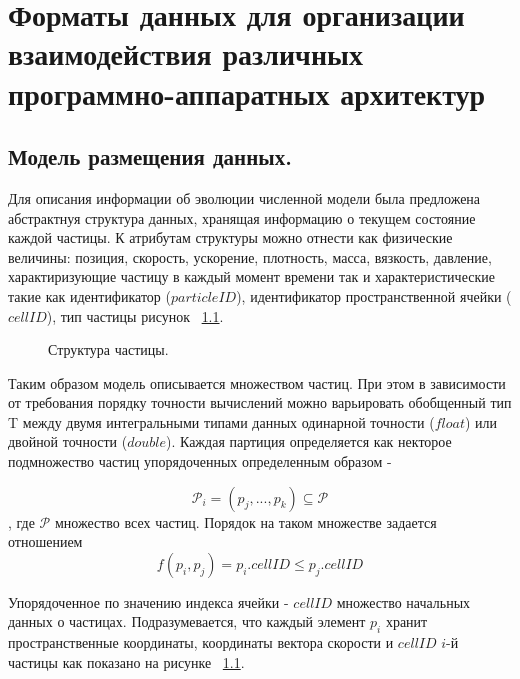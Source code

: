 \chapter{Форматы данных для организации взаимодействия различных программно-аппаратных архитектур}\label{ch:ch3}

\section{Модель размещения данных.}\label{sec:ch3/sect1}

Для описания информации об эволюции численной модели была предложена абстрактнуя структура данных, хранящая информацию о текущем состояние каждой частицы. К атрибутам структуры можно отнести как физические величины: позиция, скорость, ускорение, плотность, масса, вязкость, давление, характиризующие частицу в каждый момент времени так и характеристические такие как идентификатор (\(particleID\)), идентификатор пространственной ячейки (\(cellID\)), тип частицы рисунок ~\ref{fig:p_struct}.
\begin{figure}[ht]
  \caption{Структура частицы.}\label{fig:p_struct}
\end{figure}

Таким образом модель описывается множеством частиц. При этом в зависимости от требования порядку точности вычислений можно варьировать обобщенный тип T между двумя интегральными типами данных одинарной точности (\(float\)) или двойной точности (\(double\)). Каждая партиция определяется как некторое подмножество частиц упорядоченных определенным образом -

\[
  \mathcal{P}_i = (p_{j},...,p_{k}) \subseteq \mathcal{P}
\],
где \(\mathcal{P}\) множество всех частиц. Порядок на таком множестве задается отношением
\[
  f(p_i, p_j) = p_i.cellID \leq p_j.cellID
\]

Упорядоченное по значению индекса ячейки - \(cellID\) множество начальных данных о частицах. Подразумевается, что каждый элемент \(p_i\) хранит пространственные координаты, координаты вектора скорости и \(cellID\) \(i\)-й частицы как показано на рисунке ~\ref{fig:p_struct}. 


